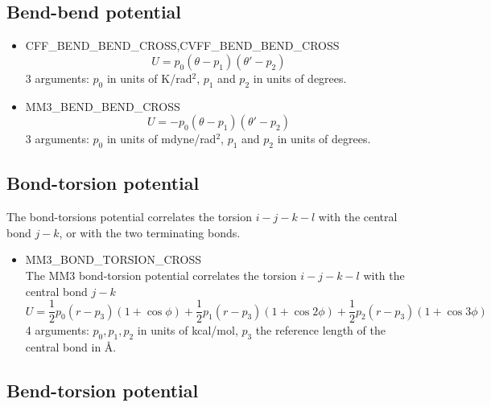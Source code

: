 \subsection{Bend-bend potential}

\begin{itemize}
  \item{CFF\_BEND\_BEND\_CROSS,CVFF\_BEND\_BEND\_CROSS}\\
  \begin{equation}
  U=p_0\left(\theta-p_1\right)\left(\theta'-p_2\right)
  \end{equation}
  3 arguments: $p_0$ in units of K/rad$^2$, $p_1$ and $p_2$ in units of degrees.

 \item{MM3\_BEND\_BEND\_CROSS}
  \begin{equation}
  U=-p_0\left(\theta-p_1\right)\left(\theta'-p_2\right)
  \end{equation}
  3 arguments: $p_0$ in units of mdyne/rad$^2$, $p_1$ and $p_2$ in units of degrees.
\end{itemize}

\subsection{Bond-torsion potential}

The bond-torsions potential correlates the torsion $i-j-k-l$ with the central bond $j-k$,
or with the two terminating bonds.

\begin{itemize}
 \item{MM3\_BOND\_TORSION\_CROSS}\\
The MM3 bond-torsion potential correlates the torsion $i-j-k-l$ with the central bond $j-k$
  \begin{equation}
  U=\frac{1}{2}p_0\left(r-p_3\right)\left(1+\cos\phi\right)+
    \frac{1}{2}p_1\left(r-p_3\right)\left(1+\cos2\phi\right)+
    \frac{1}{2}p_2\left(r-p_3\right)\left(1+\cos3\phi\right)
  \end{equation}
  4 arguments: $p_0,p_1,p_2$ in units of kcal/mol, $p_3$ the reference length of the central bond in \AA.
\end{itemize}


\subsection{Bend-torsion potential}

